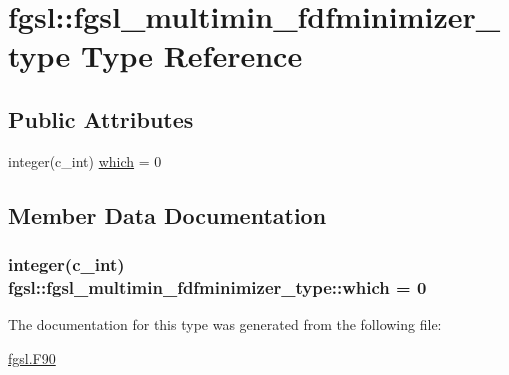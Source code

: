 \hypertarget{structfgsl_1_1fgsl__multimin__fdfminimizer__type}{\section{fgsl\-:\-:fgsl\-\_\-multimin\-\_\-fdfminimizer\-\_\-type Type Reference}
\label{structfgsl_1_1fgsl__multimin__fdfminimizer__type}
}
\subsection*{Public Attributes}
\begin{DoxyCompactItemize}
\item 
integer(c\-\_\-int) \hyperlink{structfgsl_1_1fgsl__multimin__fdfminimizer__type_acffe581bd4f5cee270a5c8baa5f88653}{which} = 0
\end{DoxyCompactItemize}


\subsection{Member Data Documentation}
\hypertarget{structfgsl_1_1fgsl__multimin__fdfminimizer__type_acffe581bd4f5cee270a5c8baa5f88653}{
\subsubsection[{which}]{\setlength{\rightskip}{0pt plus 5cm}integer(c\-\_\-int) fgsl\-::fgsl\-\_\-multimin\-\_\-fdfminimizer\-\_\-type\-::which = 0}}\label{structfgsl_1_1fgsl__multimin__fdfminimizer__type_acffe581bd4f5cee270a5c8baa5f88653}


The documentation for this type was generated from the following file\-:\begin{DoxyCompactItemize}
\item 
\hyperlink{fgsl_8F90}{fgsl.\-F90}\end{DoxyCompactItemize}
